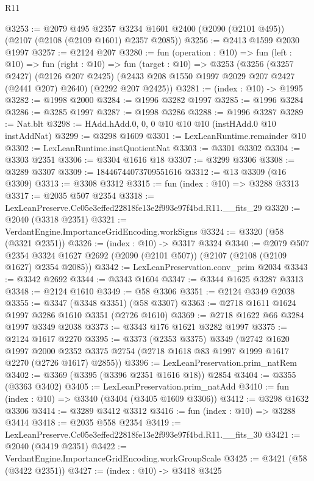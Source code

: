 \begin{lexlean}{R11}
\begin{coremodule}
@3253 := @2079
    @495
    @2357
    @3234
    @1601
    @2400
    (@2090 (@2101 @495))
    (@2107 (@2108 (@2109 @1601) @2357 @2085))
@3256 := @2413 @1599 @2030 @1997
@3257 := @2124 @207
@3280 := fun (operation : @10) =>
  fun (left : @10) =>
  fun (right : @10) =>
  fun (target : @10) =>
  @3253
    (@3256
      (@3257 @2427)
      (@2126 @207 @2425)
      (@2433 @208 @1550 @1997 @2029 @207 @2427 (@2441 @207) @2640)
      (@2292 @207 @2425))
@3281 := (index : @10) -> @1995
@3282 := @1998 @2000
@3284 := @1996 @3282 @1997
@3285 := @1996 @3284
@3286 := @3285 @1997
@3287 := @1998 @3286
@3288 := @1996 @3287
@3289 := Nat.blt
@3298 := HAdd.hAdd.{0, 0, 0} @10 @10 @10 (instHAdd.{0} @10 instAddNat)
@3299 := @3298 @1609
@3301 := LexLeanRuntime.remainder @10
@3302 := LexLeanRuntime.instQuotientNat
@3303 := @3301 @3302
@3304 := @3303 @2351
@3306 := @3304 @1616 @18
@3307 := @3299 @3306
@3308 := @3289 @3307
@3309 := 18446744073709551616
@3312 := @13 @3309 (@16 @3309)
@3313 := @3308 @3312
@3315 := fun (index : @10) => @3288 @3313
@3317 := @2035 @507 @2354
@3318 := LexLeanPreserve.Cc05e3effed22818fe13e2f993e97f4bd.R11.__fits_29
@3320 := @2040 (@3318 @2351)
@3321 := VerdantEngine.ImportanceGridEncoding.workSigns
@3324 := @3320 (@58 (@3321 @2351))
@3326 := (index : @10) -> @3317 @3324
@3340 := @2079
    @507
    @2354
    @3324
    @1627
    @2692
    (@2090 (@2101 @507))
    (@2107 (@2108 (@2109 @1627) @2354 @2085))
@3342 := LexLeanPreservation.conv_prim @2034
@3343 := @3342 @2692
@3344 := @3343 @1604
@3347 := @3344 @1625 @3287 @3313
@3348 := @2124 @1610
@3349 := @58 @3306
@3351 := @2124 @3349 @2038
@3355 := @3347 (@3348 @3351) (@58 @3307)
@3363 := @2718 @1611 @1624 @1997 @3286 @1610 @3351 (@2726 @1610)
@3369 := @2718 @1622 @66 @3284 @1997 @3349 @2038
@3373 := @3343 @176 @1621 @3282 @1997
@3375 := @2124 @1617 @2270
@3395 := @3373
    (@2353 @3375)
    @3349
    (@2742
      @1620
      @1997
      @2000
      @2352
      @3375
      @2754
      (@2718 @1618 @83 @1997 @1999 @1617 @2270 (@2726 @1617) @2855))
@3396 := LexLeanPreservation.prim_natRem
@3402 := @3369 (@3395 (@3396 @2351 @1616 @18)) @2854
@3404 := @3355 (@3363 @3402)
@3405 := LexLeanPreservation.prim_natAdd
@3410 := fun (index : @10) => @3340 (@3404 (@3405 @1609 @3306))
@3412 := @3298 @1632 @3306
@3414 := @3289 @3412 @3312
@3416 := fun (index : @10) => @3288 @3414
@3418 := @2035 @558 @2354
@3419 := LexLeanPreserve.Cc05e3effed22818fe13e2f993e97f4bd.R11.__fits_30
@3421 := @2040 (@3419 @2351)
@3422 := VerdantEngine.ImportanceGridEncoding.workGroupScale
@3425 := @3421 (@58 (@3422 @2351))
@3427 := (index : @10) -> @3418 @3425

\end{coremodule}
\end{lexlean}
